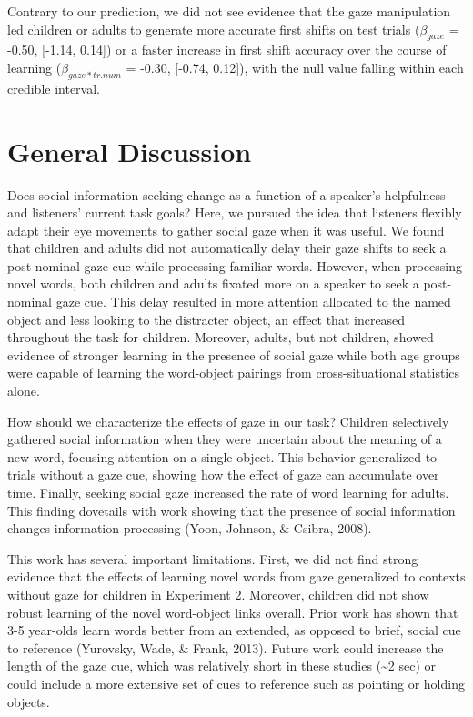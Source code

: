 \documentclass[10pt, letterpaper]{article}
\begin{document}
Contrary to our prediction, we did not see evidence that the gaze
manipulation led children or adults to generate more accurate first
shifts on test trials (\(\beta_{gaze}\) = -0.50, {[}-1.14, 0.14{]}) or a
faster increase in first shift accuracy over the course of learning
(\(\beta_{gaze*tr.num}\) = -0.30, {[}-0.74, 0.12{]}), with the null
value falling within each credible interval.

\hypertarget{general-discussion}{%
\section{General Discussion}\label{general-discussion}}

Does social information seeking change as a function of a speaker's
helpfulness and listeners' current task goals? Here, we pursued the idea
that listeners flexibly adapt their eye movements to gather social gaze
when it was useful. We found that children and adults did not
automatically delay their gaze shifts to seek a post-nominal gaze cue
while processing familiar words. However, when processing novel words,
both children and adults fixated more on a speaker to seek a
post-nominal gaze cue. This delay resulted in more attention allocated
to the named object and less looking to the distracter object, an effect
that increased throughout the task for children. Moreover, adults, but
not children, showed evidence of stronger learning in the presence of
social gaze while both age groups were capable of learning the
word-object pairings from cross-situational statistics alone.

How should we characterize the effects of gaze in our task? Children
selectively gathered social information when they were uncertain about
the meaning of a new word, focusing attention on a single object. This
behavior generalized to trials without a gaze cue, showing how the
effect of gaze can accumulate over time. Finally, seeking social gaze
increased the rate of word learning for adults. This finding dovetails
with work showing that the presence of social information changes
information processing (Yoon, Johnson, \& Csibra, 2008).

This work has several important limitations. First, we did not find
strong evidence that the effects of learning novel words from gaze
generalized to contexts without gaze for children in Experiment 2.
Moreover, children did not show robust learning of the novel word-object
links overall. Prior work has shown that 3-5 year-olds learn words
better from an extended, as opposed to brief, social cue to reference
(Yurovsky, Wade, \& Frank, 2013). Future work could increase the length
of the gaze cue, which was relatively short in these studies
(\textasciitilde{}2 sec) or could include a more extensive set of cues
to reference such as pointing or holding objects.
\end{document}

